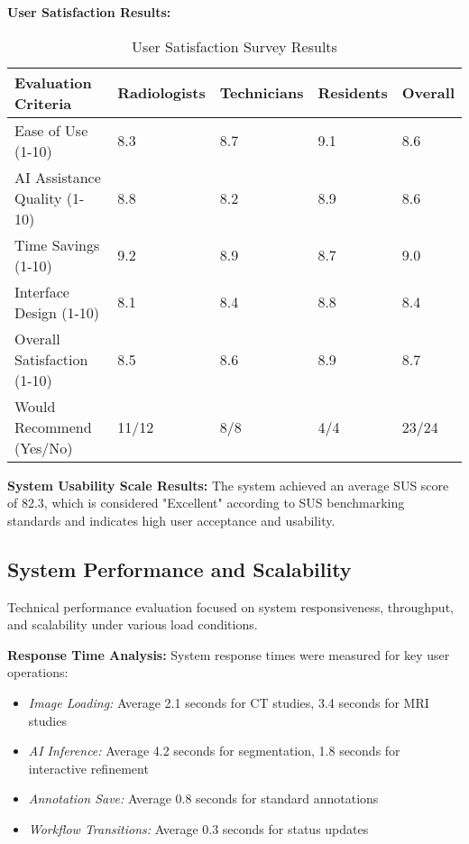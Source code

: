 \textbf{User Satisfaction Results:}

\begin{table}[htbp]
\centering
\caption{User Satisfaction Survey Results}
\label{tab:user-satisfaction}
\begin{tabular}{|p{4cm}|p{2cm}|p{2cm}|p{2cm}|p{2cm}|}
\hline
\textbf{Evaluation Criteria} & \textbf{Radiologists} & \textbf{Technicians} & \textbf{Residents} & \textbf{Overall} \\
\hline
Ease of Use (1-10) & 8.3 & 8.7 & 9.1 & 8.6 \\
\hline
AI Assistance Quality (1-10) & 8.8 & 8.2 & 8.9 & 8.6 \\
\hline
Time Savings (1-10) & 9.2 & 8.9 & 8.7 & 9.0 \\
\hline
Interface Design (1-10) & 8.1 & 8.4 & 8.8 & 8.4 \\
\hline
Overall Satisfaction (1-10) & 8.5 & 8.6 & 8.9 & 8.7 \\
\hline
Would Recommend (Yes/No) & 11/12 & 8/8 & 4/4 & 23/24 \\
\hline
\end{tabular}
\end{table}

\textbf{System Usability Scale Results:} The system achieved an average SUS score of 82.3, which is considered "Excellent" according to SUS benchmarking standards and indicates high user acceptance and usability.

\subsection{System Performance and Scalability}

Technical performance evaluation focused on system responsiveness, throughput, and scalability under various load conditions.

\textbf{Response Time Analysis:} System response times were measured for key user operations:

\begin{itemize}
    \item \textit{Image Loading:} Average 2.1 seconds for CT studies, 3.4 seconds for MRI studies
    \item \textit{AI Inference:} Average 4.2 seconds for segmentation, 1.8 seconds for interactive refinement
    \item \textit{Annotation Save:} Average 0.8 seconds for standard annotations
    \item \textit{Workflow Transitions:} Average 0.3 seconds for status updates
\end{itemize}

